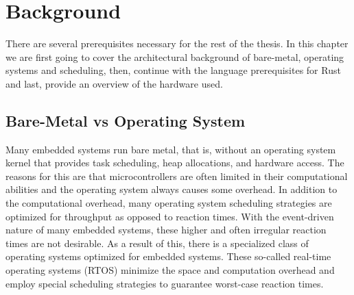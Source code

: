 \chapter{Background}
\label{chap:background}

There are several prerequisites necessary for the rest of the thesis.
In this chapter we are first going to cover the architectural background of bare-metal, operating systems and scheduling,
then, continue with the language prerequisites for Rust and last, provide an overview of the hardware used.

\section{Bare-Metal vs Operating System}
\label{sec:background:bm_vs_os}

Many embedded systems run bare metal, that is, without an operating system kernel that provides task scheduling, heap allocations, and hardware access.
The reasons for this are that microcontrollers are often limited in their computational abilities and the operating system always causes some overhead.
In addition to the computational overhead, many operating system scheduling strategies are optimized for throughput as opposed to reaction times.
With the event-driven nature of many embedded systems, these higher and often irregular reaction times are not desirable.
As a result of this, there is a specialized class of operating systems optimized for embedded systems.
These so-called real-time operating systems (RTOS) minimize the space and computation overhead and employ special scheduling strategies to guarantee worst-case reaction times.

